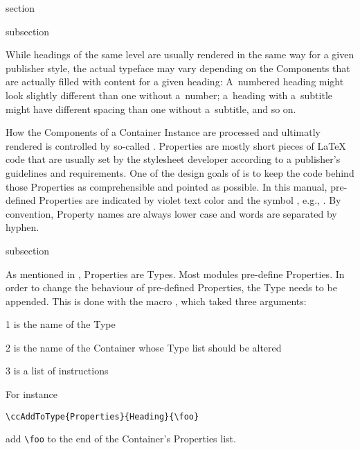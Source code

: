 \begin{Heading}{section}
\end{Heading}

\begin{Heading}{subsection}
\end{Heading}

While headings of the same level are usually rendered in the same way
for a given publisher style, the actual typeface may vary depending on
the Components that are actually filled with content for a given
heading: A~numbered heading might look slightly different than one
without a~number; a~heading with a~subtitle might have different
spacing than one without a~subtitle, and so on.

How the Components of a Container Instance are processed and ultimatly
rendered is controlled by so-called
. Properties are mostly short pieces of
{\LaTeX} code that are usually set by the stylesheet developer
according to a publisher's guidelines and requirements. One of the
design goals of {\CoCoTeX} is to keep the code behind those Properties
as comprehensible and pointed as possible. In this manual, pre-defined
Properties are indicated by violet text color and the symbol
{\PropertySymbol}, e.g., . By convention,
Property names are always lower case and words are separated by
hyphen.


\begin{Heading}{subsection}
\end{Heading}

As mentioned in , Properties are Types. Most
{\CoCoTeX} modules pre-define Properties. In order to change the
behaviour of pre-defined Properties, the Type needs to be
appended. This is done with the macro \DescribeMacro{\ccAddToType}, which taked three arguments:
\begin{ArgList}
\item[1] is the name of the Type
\item[2] is the name of the Container whose Type list should be altered
\item[3] is a list of instructions
\end{ArgList}
For instance
\begin{lstlisting}[style=tex]
\ccAddToType{Properties}{Heading}{\foo}
\end{lstlisting}
add \lstinline{\foo} to the end of the 
Container's Properties list.

